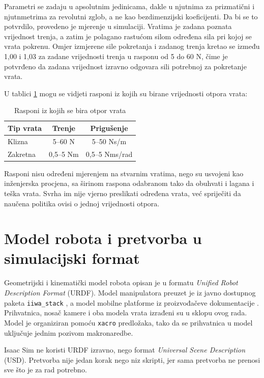 Parametri se zadaju u apsolutnim jedinicama, dakle u njutnima za prizmatični i njutnmetrima za
revolutni zglob, a ne kao bezdimenzijski koeficijenti. Da bi se to potvrdilo, provedeno je
mjerenje u simulaciji. Vratima je zadana poznata vrijednost trenja, a zatim je polagano rastućom
silom određena sila pri kojoj se vrata pokrenu. Omjer izmjerene sile pokretanja i zadanog trenja
kretao se između 1,00 i 1,03 za zadane vrijednosti trenja u rasponu od 5 do 60 N, čime
je potvrđeno da zadana vrijednost izravno odgovara sili potrebnoj za pokretanje vrata.

U tablici \ref{tab:otpor-nasumicnost} mogu se vidjeti rasponi iz kojih su birane vrijednosti otpora vrata:

\begin{table}[H]
    \centering
    \caption{Rasponi iz kojih se bira otpor vrata}
    \label{tab:otpor-nasumicnost}
    \begin{tabular}{@{}lcc@{}}
        \toprule
        Tip vrata & Trenje    & Prigušenje     \\
        \midrule
        Klizna    & 5--60 N   & 5--50 Ns/m     \\
        Zakretna  & 0,5--5 Nm & 0,5--5 Nms/rad \\
        \bottomrule
    \end{tabular}
\end{table}

Rasponi nisu određeni mjerenjem na stvarnim vratima, nego su usvojeni kao inženjerska
procjena, sa širinom raspona odabranom tako da obuhvati i lagana i teška vrata. Svrha im nije
vjerno preslikati određena vrata, već spriječiti da naučena politika ovisi o jednoj
vrijednosti otpora.

\section{Model robota i pretvorba u simulacijski format}
\label{sec:urdf-usd}

Geometrijski i kinematički model robota opisan je u formatu \textit{Unified Robot Description Format} (URDF). Model manipulatora preuzet
je iz javno dostupnog paketa \texttt{iiwa\_stack} \cite{iiwastack}, a model mobilne platforme
iz proizvođačeve dokumentacije \cite{kuka2024kmriiwa}. Prihvatnica, nosač kamere i oba modela
vrata izrađeni su u sklopu ovog rada. Model je organiziran pomoću \texttt{xacro} predložaka,
tako da se prihvatnica u model uključuje jednim pozivom makronaredbe.

Isaac Sim ne koristi URDF izravno, nego format \textit{Universal Scene Description} (USD). Pretvorba nije jedan korak nego niz
skripti, jer sama pretvorba ne prenosi sve što je za rad potrebno.

